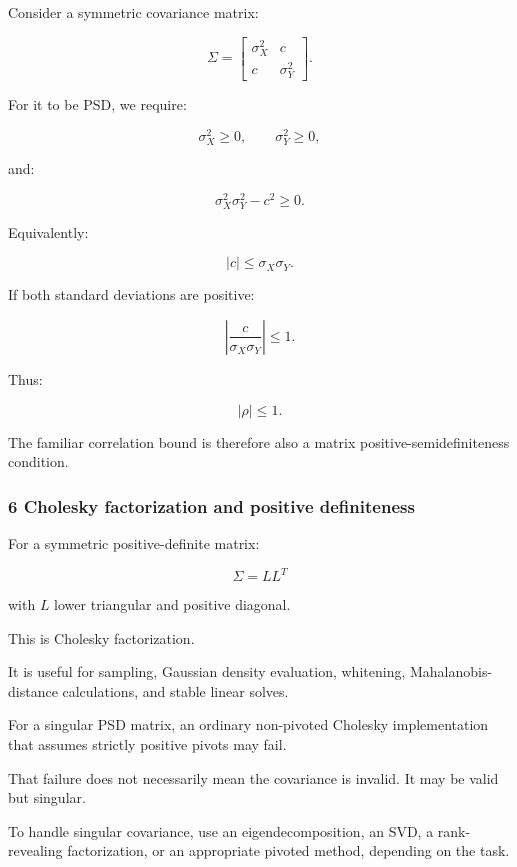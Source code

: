 \hypertarget{02-foundations-ii-ch024-a-2d-covariance-validity-condition}{}

Consider a symmetric covariance matrix:

\[
 \Sigma= \begin{bmatrix} \sigma_X^2&c\\ c&\sigma_Y^2 \end{bmatrix}.
\]

For it to be PSD, we require:

\[
 \sigma_X^2\ge0, \qquad \sigma_Y^2\ge0,
\]

and:

\[
 \boxed{ \sigma_X^2\sigma_Y^2-c^2\ge0 }.
\]

Equivalently:

\[
 |c|\le\sigma_X\sigma_Y.
\]

If both standard deviations are positive:

\[
 \left|\frac{c}{\sigma_X\sigma_Y}\right|\le1.
\]

Thus:

\[
 \boxed{|\rho|\le1}.
\]

The familiar correlation bound is therefore also a matrix positive-semidefiniteness condition.

\subsubsection{6 Cholesky factorization and positive definiteness}\label{02-foundations-ii-ch024-cholesky-factorization-and-positive-definiteness}

\hypertarget{02-foundations-ii-ch024-cholesky-factorization-and-positive-definiteness}{}

For a symmetric positive-definite matrix:

\[
 \boxed{\Sigma=LL^T}
\]

with \(L\) lower triangular and positive diagonal.

This is Cholesky factorization.

It is useful for sampling, Gaussian density evaluation, whitening, Mahalanobis-distance calculations, and stable linear solves.

For a singular PSD matrix, an ordinary non-pivoted Cholesky implementation that assumes strictly positive pivots may fail.

That failure does not necessarily mean the covariance is invalid. It may be valid but singular.

To handle singular covariance, use an eigendecomposition, an SVD, a rank-revealing factorization, or an appropriate pivoted method, depending on the task.

